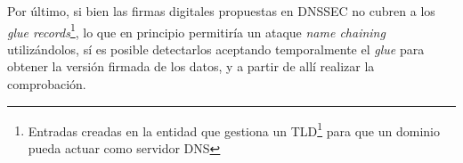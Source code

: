 Por \'ultimo, si bien las firmas digitales propuestas en DNSSEC no cubren a los \textit{glue records}\footnote{Entradas creadas en la entidad que gestiona un TLD\footnote{Top-Level Domain} para que un dominio pueda actuar como servidor DNS}, lo que en principio permitir\'ia un ataque \textit{name chaining} utiliz\'andolos, s\'i es posible detectarlos aceptando temporalmente el \textit{glue} para obtener la versi\'on firmada de los datos, y a partir de all\'i realizar la comprobaci\'on.